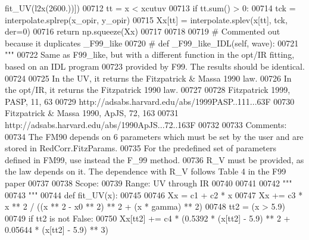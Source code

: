 \begin{DoxyCode}
{      fit\_UV(l2x(2600.))])
00712         tt = x < xcutuv
00713         \textcolor{keywordflow}{if} tt.sum() > 0:
00714             tck = interpolate.splrep(x\_opir, y\_opir)
00715             Xx[tt] = interpolate.splev(x[tt], tck, der=0)
00716         \textcolor{keywordflow}{return} np.squeeze(Xx)
00717 
00718 
00719 \textcolor{comment}{# Commented out because it duplicates \_F99\_like}
00720 \textcolor{comment}{#    def \_F99\_like\_IDL(self, wave):}
00721         \textcolor{stringliteral}{"""}
00722 \textcolor{stringliteral}{        Same as F99\_like, but with a different function in the opt/IR fitting, based on an IDL program}
00723 \textcolor{stringliteral}{        provided by F99. The results should be identical.}
00724 \textcolor{stringliteral}{    }
00725 \textcolor{stringliteral}{        In the UV, it returns the Fitzpatrick & Massa 1990 law.}
00726 \textcolor{stringliteral}{        In the opt/IR, it returns the Fitzpatrick 1990 law. }
00727 \textcolor{stringliteral}{        }
00728 \textcolor{stringliteral}{        Fitzpatrick 1999, PASP, 11, 63}
00729 \textcolor{stringliteral}{        http://adsabs.harvard.edu/abs/1999PASP..111...63F}
00730 \textcolor{stringliteral}{        Fitzpatrick & Massa 1990, ApJS, 72, 163}
00731 \textcolor{stringliteral}{        http://adsabs.harvard.edu/abs/1990ApJS...72..163F}
00732 \textcolor{stringliteral}{        }
00733 \textcolor{stringliteral}{        Comments:}
00734 \textcolor{stringliteral}{        The FM90 depends on 6 parameters which must be set by the user and are stored in
       RedCorr.FitzParams.}
00735 \textcolor{stringliteral}{        For the predefined set of parameters defined in FM99, use instead the F\_99 method.}
00736 \textcolor{stringliteral}{        R\_V must be provided, as the law depends on it. The dependence with R\_V follows Table 4 in the F99
       paper }
00737 \textcolor{stringliteral}{}
00738 \textcolor{stringliteral}{        Scope:    }
00739 \textcolor{stringliteral}{        Range: UV through IR}
00740 \textcolor{stringliteral}{        }
00741 \textcolor{stringliteral}{        }
00742 \textcolor{stringliteral}{        """}
00743         \textcolor{stringliteral}{"""}
00744 \textcolor{stringliteral}{        def fit\_UV(x):}
00745 \textcolor{stringliteral}{}
00746 \textcolor{stringliteral}{            Xx = c1 + c2 * x}
00747 \textcolor{stringliteral}{            Xx += c3 * x ** 2 / ((x ** 2 - x0 ** 2) ** 2 + (x * gamma) ** 2)}
00748 \textcolor{stringliteral}{            tt2 = (x > 5.9) }
00749 \textcolor{stringliteral}{            if tt2 is not False:}
00750 \textcolor{stringliteral}{                Xx[tt2] += c4 * (0.5392 * (x[tt2] - 5.9) ** 2 + 0.05644 * (x[tt2] - 5.9) ** 3)}
}
\end{DoxyCode}
